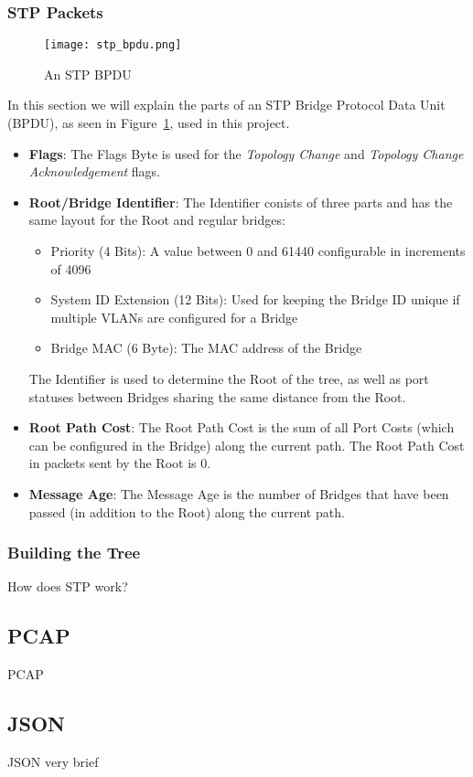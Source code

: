 \subsubsection{STP Packets}
\begin{figure}[h]
    \centering
    \texttt{[image: stp\_bpdu.png]}
    \caption{An STP BPDU}
    \label{fig:stp_bpdu}
\end{figure}
In this section we will explain the parts of an STP Bridge Protocol Data Unit (BPDU), as seen in Figure~\ref{fig:stp_bpdu}, used in this project.
\begin{itemize}
    \item \textbf{Flags}: The Flags Byte is used for the \textit{Topology Change} and \textit{Topology Change Acknowledgement} flags.
    \item \textbf{Root/Bridge Identifier}: The Identifier conists of three parts and has the same layout for the Root and regular bridges:
        \begin{itemize}
            \item Priority (4 Bits): A value between 0 and 61440 configurable in increments of 4096
            \item System ID Extension (12 Bits): Used for keeping the Bridge ID unique if multiple VLANs are configured for a Bridge
            \item Bridge MAC (6 Byte): The MAC address of the Bridge
        \end{itemize}
        The Identifier is used to determine the Root of the tree, as well as port statuses between Bridges sharing the same distance from the Root.
    \item \textbf{Root Path Cost}: The Root Path Cost is the sum of all Port Costs (which can be configured in the Bridge) along the current path. The Root Path Cost in packets sent by the Root is 0.
    \item \textbf{Message Age}: The Message Age is the number of Bridges that have been passed (in addition to the Root) along the current path.
\end{itemize}
\subsubsection{Building the Tree} 
How does STP work?
\subsection{PCAP}
PCAP 
\subsection{JSON}
JSON very brief
